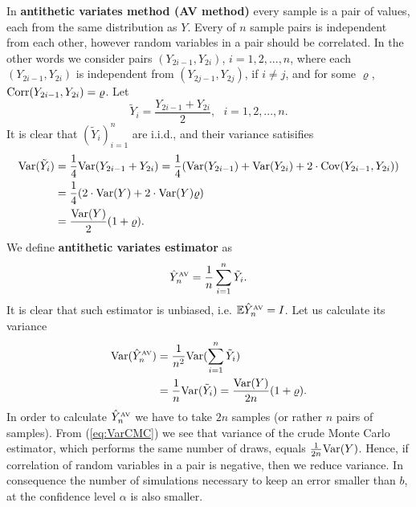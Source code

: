 \documentclass[a4paper,11pt, twoside]{book}
\theoremstyle{definition}
\theoremstyle{remark}
\def\Var{{\rm Var}}
\def\E{{\mathbb{E}}}
\def\Cov{{\hbox{Cov}}}
\def\Corr{{\hbox{Corr}}}
\def\AV[#1]{\hat{Y}^{\hbox{\tiny AV}}_{#1}}
\begin{document}
In \textbf{antithetic variates method (AV method)} every sample is a pair of values, each from the same distribution as $Y$. Every of $n$ sample pairs is independent from each other, however random variables in a pair should be correlated. In the other words we consider pairs $(Y_{2i-1}, Y_{2i})$, $i=1,2,...,n$,
where each $(Y_{2i-1}, Y_{2i})$ is independent from $(Y_{2j-1}, Y_{2j})$, if $i \neq j$, and for some $\varrho$, $\Corr(Y_{2i-1}, Y_{2i}) = \varrho$. Let
\begin{equation*}
 \tilde{Y}_i = \frac{Y_{2i-1} + Y_{2i}}{2},\ \ \ i = 1,2,...,n.
\end{equation*}
It is clear that $(\tilde{Y}_i)_{i=1}^n$ are i.i.d., and their variance satisifies
\begin{equation*}
 \begin{split}
 \Var(\tilde{Y}_i) &= \dfrac{1}{4} \Var( Y_{2i-1} + Y_{2i} ) = \dfrac{1}{4} (\Var(Y_{2i-1}) + \Var(Y_{2i}) + 2\cdot\Cov(Y_{2i-1}, Y_{2i})) \\
 &= \dfrac{1}{4} (2\cdot\Var(Y) + 2\cdot\Var(Y)\varrho) \\
 &= \dfrac{\Var(Y)}{2} (1 + \varrho).
 \end{split}
\end{equation*}
We define \textbf{antithetic variates estimator} as
\begin{equation*}
 \AV[n] = \frac{1}{n}\sum\limits_{i=1}^n \tilde{Y}_i.
\end{equation*}
It is clear that such estimator is unbiased, i.e. $\E\AV[n] = I$. Let us calculate its variance
\begin{equation}
 \label{eq:VarAV}
 \begin{split}
 \Var(\AV[n]) &= \frac{1}{n^2} \Var(\sum\limits_{i=1}^n \tilde{Y}_i) \\
   &= \frac{1}{n} \Var(\tilde{Y}_i) = \dfrac{\Var(Y)}{2n} (1 + \varrho).
 \end{split}
\end{equation}
In order to calculate $\AV[n]$ we have to take $2n$ samples (or rather $n$ pairs of samples). From (\ref{eq:VarCMC}) we see that variance of the crude Monte Carlo estimator, which performs the same number of draws, equals $\frac{1}{2n}\Var(Y)$. Hence, if correlation of random variables in a pair is negative, then we reduce variance. In consequence the number of simulations necessary to keep an error smaller than $b$, at the confidence level $\alpha$ is also smaller.
\end{document}
